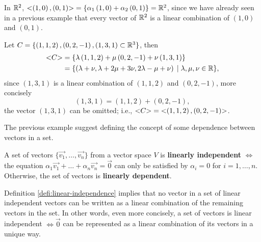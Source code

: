 \begin{example}
    In $\mathbb{R}^2$, $\mathopen{<} \left( 1, 0 \right) , \left( 0, 1 \right)  \mathclose{>} = \{\alpha_1\left( 1, 0 \right) +
    \alpha_2\left( 0, 1 \right) \} = \mathbb{R}^2 $, since we have already seen in a previous example that every
    vector of $\mathbb{R}^2$ is a linear combination of $\left( 1, 0 \right) $ and $\left( 0, 1 \right) $.
\end{example}

\begin{example}
    Let $C = \{\left( 1, 1, 2 \right), \left( 0, 2, -1 \right), \left( 1, 3, 1 \right) \subset\mathbb{R}^3\} $, then
    \begin{align}
        \mathopen{<} C \mathclose{>} &= \{\lambda\left( 1, 1, 2 \right) + \mu\left( 0, 2, -1 \right) + \nu\left( 1, 3, 1 \right)\}
             \\ &= \{\left( \lambda + \nu, \lambda + 2\mu + 3\nu, 2\lambda - \mu + \nu \right) \; | \;\lambda,
              \mu, \nu\in\mathbb{R}\},
    \end{align}
    since $\left( 1, 3, 1 \right) $ is a linear combination of $\left( 1, 1, 2 \right) $ and $\left( 0, 2, -1
    \right) $, more concisely
    \begin{equation}
        \left( 1, 3, 1 \right) = \left( 1, 1, 2 \right) + \left( 0, 2, -1 \right),
    \end{equation}
    the vector $\left( 1, 3, 1 \right) $ can be omitted; i.e., $\mathopen{<} C \mathclose{>} = \mathopen{<} \left( 1, 1, 2 \right), \left(
    0, 2, -1\right)  \mathclose{>}$.
\end{example}

The previous example suggest defining the concept of some dependence between vectors in a set.

\begin{defi} \label{defi:linear-independence}
    A set of vectors $\{\vec{v_1}, \ldots, \vec{v_n}\} $ from a vector space $V$ is \textbf{linearly
    independent} $\iff$ the equation $\alpha_1\vec{v_1} + \ldots + \alpha_n\vec{v_n} = \vec{0}$ can only
    be satisfied by $\alpha_i = 0$ for $i = 1, \ldots, n$. Otherwise, the set of vectors is
    \textbf{linearly dependent}.
\end{defi}

\begin{remark}
    Definition \ref{defi:linear-independence} implies that no vector in a set of linear independent vectors can be written as a linear combination of the remaining vectors in the set. In other words, even more concisely, a set of vectors is linear independent $\iff\vec{0}$ can be represented as a linear combination of its vectors in a unique way.
\end{remark}


